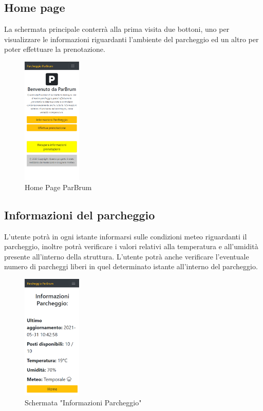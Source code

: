 \documentclass[a4paper,11pt]{report}
\begin{document}
\subsection{Home page}
La schermata principale conterrà alla prima visita due bottoni, uno per visualizzare le informazioni riguardanti l'ambiente del parcheggio ed un altro per poter effettuare la prenotazione.
\begin{figure}[H]
    \centering
    \includegraphics[width=0.25\textwidth]{home_page.png}
    \caption{Home Page ParBrum}
    \label{fig:homePage}
\end{figure}
\subsection{Informazioni del parcheggio}
L'utente potrà in ogni istante informarsi sulle condizioni meteo riguardanti il parcheggio, inoltre potrà verificare i valori relativi alla temperatura e all'umidità presente all'interno della struttura. L'utente potrà anche verificare l'eventuale numero di parcheggi liberi in quel determinato istante all'interno del parcheggio.
\begin{figure}[H]
    \centering
    \includegraphics[width=0.25\textwidth]{info_parcheggio.png}
    \caption{Schermata "Informazioni Parcheggio" }
    \label{fig:infoParcheggio}
\end{figure}
\end{document}
